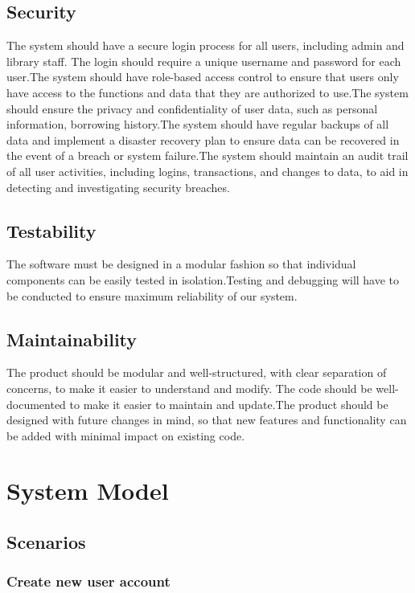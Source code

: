 \subsection{Security}
The system should have a secure login process for all users, including admin and library staff. The login should require a unique username and password for each user.The system should have role-based access control to ensure that users only have access to the functions and data that they are authorized to use.The system should ensure the privacy and confidentiality of user data, such as personal information, borrowing history.The system should have regular backups of all data and implement a disaster recovery plan to ensure data can be recovered in the event of a breach or system failure.The system should maintain an audit trail of all user activities, including logins, transactions, and changes to data, to aid in detecting and investigating security breaches.

\subsection{Testability}
The software must be designed in a modular fashion so that individual components can be easily tested in isolation.Testing and debugging will have to be conducted to ensure maximum reliability of our system.

\subsection{Maintainability}
The product should be modular and well-structured, with clear separation of concerns, to make it easier to understand and modify.
The code should be well-documented to make it easier to maintain and update.The product should be designed with future changes in mind, so that new features and functionality can be added with minimal impact on existing code.

\section{System Model}
\subsection{Scenarios}

\subsubsection{Create new user account}

